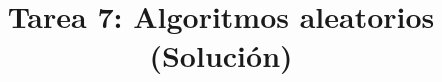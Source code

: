 \documentclass{doc}
\title{Tarea 7: Algoritmos aleatorios (Solución)}
\begin{document}
\makedocheader
\soluciontrue

\end{document}
